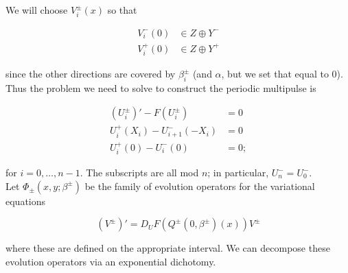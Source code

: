 \documentclass[12pt]{article}
\begin{document}
We will choose $V_i^\pm(x)$ so that

\begin{align*}
V_i^-(0) &\in Z \oplus Y^- \\
V_i^+(0) &\in Z \oplus Y^+
\end{align*}

since the other directions are covered by $\beta_i^\pm$ (and $\alpha$, but we set that equal to 0).\\

Thus the problem we need to solve to construct the periodic multipulse is

\begin{align}
(U_i^\pm)' - F(U_i^\pm) &= 0 \\
U_i^+(X_i) - U_{i+1}^-(-X_i) &= 0 \\
U_i^+(0) - U_i^-(0) &= 0;
\end{align}

for $i = 0, \dots, {n-1}$. The subscripts are all mod $n$; in particular, $U_n^- = U_0^-$.\\

Let $\Phi_\pm(x, y; \beta^\pm)$ be the family of evolution operators for the variational equations

\begin{equation}
(V^\pm)' = D_U F(Q^\pm(0, \beta^\pm)(x)) V^\pm
\end{equation}

where these are defined on the appropriate interval. We can decompose these evolution operators via an exponential dichotomy.
\end{document}
